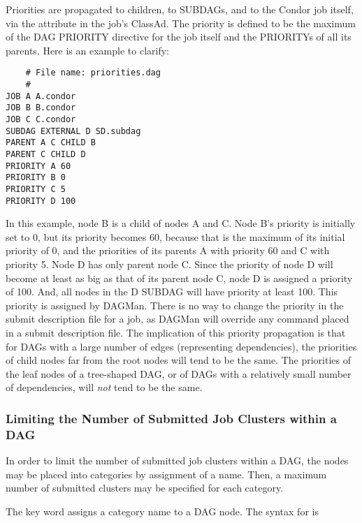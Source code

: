 Priorities are propagated to children, to SUBDAGs, 
and to the Condor job itself,
via the  attribute in the job's ClassAd. 
The priority is defined to be the maximum of the DAG PRIORITY directive 
for the job itself and the PRIORITYs of all its parents. 
Here is an example to clarify:

\footnotesize
\begin{verbatim}
    # File name: priorities.dag
    #
JOB A A.condor
JOB B B.condor
JOB C C.condor
SUBDAG EXTERNAL D SD.subdag
PARENT A C CHILD B
PARENT C CHILD D
PRIORITY A 60
PRIORITY B 0
PRIORITY C 5
PRIORITY D 100
\end{verbatim}
\normalsize

In this example, node B is a child of nodes A and C. 
Node B's priority is initially set to 0,
but its priority becomes 60,
because that is the maximum of its initial priority of 0,
and the priorities of its parents
A with priority 60 and C with priority 5.
Node D has only parent node C.
Since the priority of node D will become at least as big as that of 
its parent node C,
node D is assigned a priority of 100.
And, all nodes in the D SUBDAG will have priority at least 100.
This priority is assigned by DAGMan.
There is no way to change the priority in the submit description file for a job,
as DAGMan will override any  command placed
in a submit description file.
The implication of this priority propagation is
that for DAGs with a large number of edges (representing dependencies), 
the priorities of child nodes far from the root nodes 
will tend to be the same.
The priorities of the leaf nodes of a tree-shaped DAG,
or of DAGs with a relatively small number of dependencies,
will \emph{not} tend to be the same.

\subsubsection{\label{sec:DAG-node-category}Limiting the Number of Submitted Job Clusters within a DAG}


In order to limit the number of submitted job clusters within a DAG,
the nodes may be placed into categories by assignment of a name.
Then, a maximum number of submitted clusters may be specified
for each category.

The  key word assigns a category name to a DAG node.
The syntax for  is

